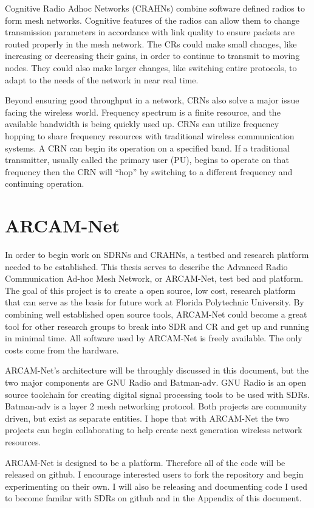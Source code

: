 Cognitive Radio Adhoc Networks (CRAHNs) combine software defined radios to form mesh networks. Cognitive features of the radios can allow them to change transmission parameters in accordance with link quality to ensure packets are routed properly in the mesh network. The CRs could make small changes, like increasing or decreasing their gains, in order to continue to transmit to moving nodes. They could also make larger changes, like switching entire protocols, to adapt to the needs of the network in near real time. 

Beyond ensuring good throughput in a network, CRNs also solve a major issue facing the wireless world. Frequency spectrum is a finite resource, and the available bandwidth is being quickly used up. CRNs can utilize frequency hopping to share frequency resources with traditional wireless communication systems. A CRN can begin its operation on a specified band. If a traditional transmitter, usually called the primary user (PU), begins to operate on that frequency then the CRN will ``hop'' by switching to a different frequency and continuing operation. 


\section{ARCAM-Net}

In order to begin work on SDRNs and CRAHNs, a testbed and research platform needed to be established. This thesis serves to describe the Advanced Radio Communication Ad-hoc Mesh Network, or ARCAM-Net, test bed and platform. The goal of this project is to create a open source, low cost, research platform that can serve as the basis for future work at Florida Polytechnic University. By combining well established open source tools, ARCAM-Net could become a great tool for other research groups to break into SDR and CR and get up and running in minimal time. All software used by ARCAM-Net is freely available. The only costs come from the hardware. 

ARCAM-Net's architecture will be throughly discussed in this document, but the two major components are GNU Radio and Batman-adv. GNU Radio is an open source toolchain for creating digital signal processing tools to be used with SDRs. Batman-adv is a layer 2 mesh networking protocol. Both projects are community driven, but exist as separate entities. I hope that with ARCAM-Net the two projects can begin collaborating to help create next generation wireless network resources. 

ARCAM-Net is designed to be a platform. Therefore all of the code will be released on github. I encourage interested users to fork the repository and begin experimenting on their own. I will also be releasing and documenting code I used to become familar with SDRs on github and in the Appendix of this document.  




